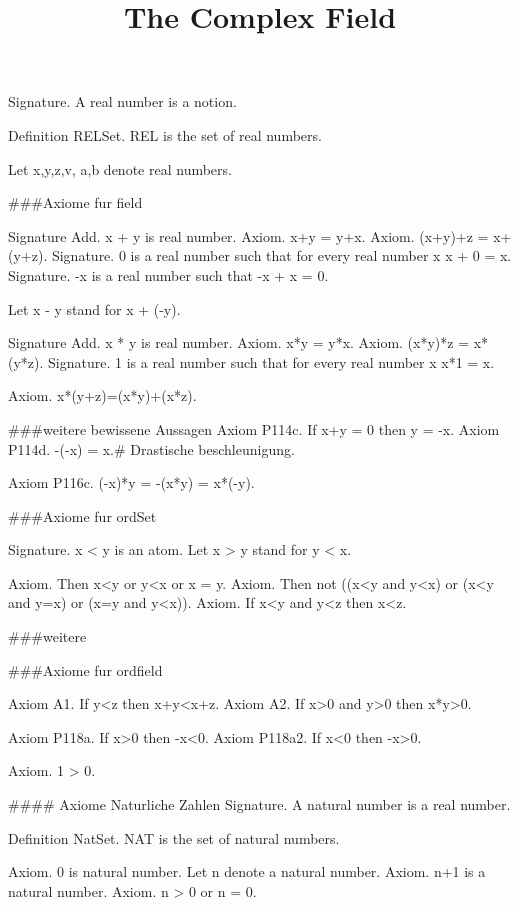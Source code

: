 \documentclass{article}
\newenvironment{forthel}{\begin{leftbar}}{\end{leftbar}}
\begin{document}
\title{The Complex Field}

\maketitle

\begin{forthel}
[set/-s] [element/-s] [number/-s]

Signature. A real number is a notion.

Definition RELSet.
REL is the set of real numbers.

Let x,y,z,v, a,b denote real numbers.

###Axiome fur field

Signature Add. x + y is real number.
Axiom. x+y = y+x.
Axiom. (x+y)+z = x+(y+z).
Signature. 0 is a real number such that for every real number x x + 0 = x.
Signature. -x is a real number such that -x + x = 0.

Let x - y stand for x + (-y).

Signature Add. x * y is real number.
Axiom. x*y = y*x.
Axiom. (x*y)*z = x*(y*z).
Signature. 1 is a real number such that for every real number x x*1 = x.


Axiom. x*(y+z)=(x*y)+(x*z).

###weitere bewissene Aussagen
Axiom P114c. If x+y = 0 then y = -x.
Axiom P114d. -(-x) = x.# Drastische beschleunigung.

Axiom P116c. (-x)*y = -(x*y) = x*(-y).


###Axiome fur ordSet

Signature. x < y is an atom.
Let x > y stand for y < x.


Axiom. Then x<y or y<x or x = y.
Axiom. Then not ((x<y and y<x) or (x<y and y=x) or (x=y and y<x)).
Axiom. If x<y and y<z then x<z.

###weitere 



###Axiome fur ordfield

Axiom A1. If y<z then x+y<x+z.
Axiom A2. If x>0 and y>0 then x*y>0.

Axiom P118a. If x>0 then -x<0.
Axiom P118a2. If x<0 then -x>0.

Axiom. 1 > 0.

#### Axiome Naturliche Zahlen
Signature. A natural number is a real number.

Definition NatSet.
NAT is the set of natural numbers.

Axiom. 0 is natural number.
Let n denote a natural number.
Axiom. n+1 is a natural number.
Axiom. n > 0 or n = 0.



\end{forthel}
\end{document}
